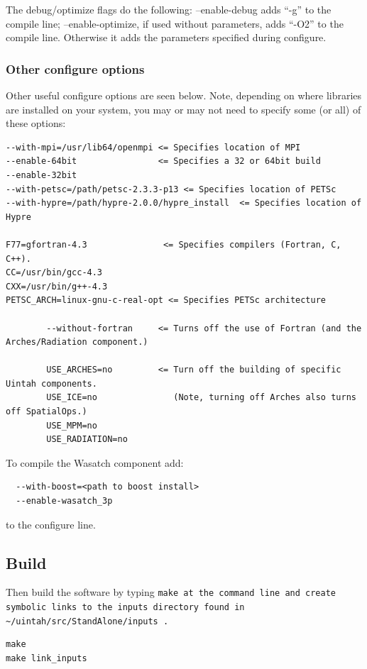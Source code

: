 \documentclass[12pt]{article}
\newcommand{\TT}[1]{\tt{#1} \normalfont}
\begin{document}
The debug/optimize flags do the following:  --enable-debug adds ``-g''
to the compile line; --enable-optimize, if used without parameters,
adds ``-O2'' to the compile line.  Otherwise it adds the parameters
specified during configure.

\subsubsection{Other configure options}

Other useful configure options are seen below.  Note, depending on
where libraries are installed on your system, you may or may not need
to specify some (or all) of these options:

\begin{verbatim}
--with-mpi=/usr/lib64/openmpi <= Specifies location of MPI
--enable-64bit                <= Specifies a 32 or 64bit build
--enable-32bit
--with-petsc=/path/petsc-2.3.3-p13 <= Specifies location of PETSc
--with-hypre=/path/hypre-2.0.0/hypre_install  <= Specifies location of Hypre

F77=gfortran-4.3               <= Specifies compilers (Fortran, C, C++).
CC=/usr/bin/gcc-4.3
CXX=/usr/bin/g++-4.3
PETSC_ARCH=linux-gnu-c-real-opt <= Specifies PETSc architecture

        --without-fortran     <= Turns off the use of Fortran (and the Arches/Radiation component.)

        USE_ARCHES=no         <= Turn off the building of specific Uintah components.
        USE_ICE=no               (Note, turning off Arches also turns off SpatialOps.)
        USE_MPM=no
        USE_RADIATION=no

\end{verbatim}
To compile the Wasatch component add:
\begin{verbatim}
  --with-boost=<path to boost install>
  --enable-wasatch_3p
\end{verbatim}
to the configure line.

\subsection{Build}

Then build the software by typing \TT{make} at the command line and create symbolic links to the inputs directory found in \TT{\textasciitilde/uintah/src/StandAlone/inputs}.
\begin{verbatim}
make
make link_inputs
\end{verbatim}
\end{document}
